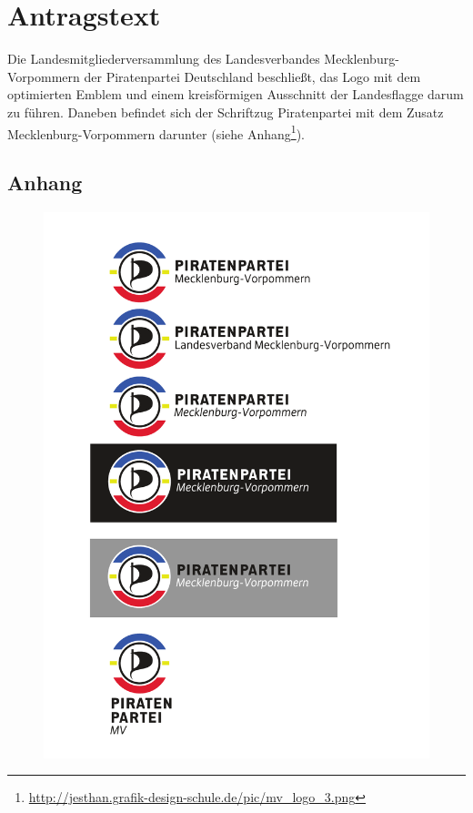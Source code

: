 \section{Antragstext}

Die Landesmitgliederversammlung des Landesverbandes Mecklenburg-Vorpommern der Piratenpartei Deutschland beschließt, das Logo mit dem optimierten Emblem und einem kreisförmigen Ausschnitt der Landesflagge darum zu führen. Daneben befindet sich der Schriftzug Piratenpartei mit dem Zusatz Mecklenburg-Vorpommern darunter (siehe Anhang\footnote{\url{http://jesthan.grafik-design-schule.de/pic/mv\_logo\_3.png}}).

\subsection{Anhang}
\vspace{-2em}
\begin{figure}[htb]
\centering
\includegraphics[scale=0.5]{antraege/logo.pdf}
\end{figure}

